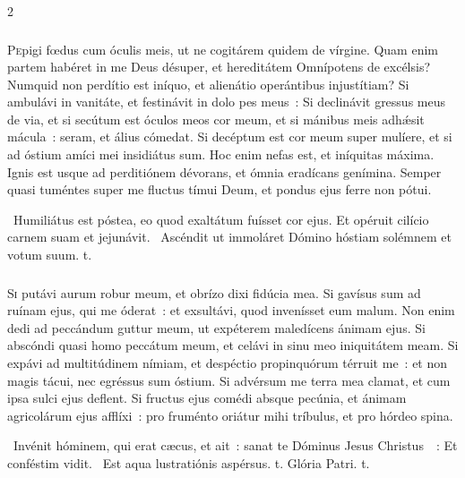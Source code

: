 \documentclass[9pt,twoside]{extarticle}
\begin{document}
\begin{multicols}{2}
{{\subsubsection*{\center{}}
\lettrine{P}epigi fœdus cum óculis meis, ut ne cogitárem quidem de vírgine. Quam enim partem habéret in me Deus désuper, et hereditátem Omnípotens de excélsis? Numquid non perdítio est iníquo, et alienátio operántibus injustítiam? Si ambulávi in vanitáte, et festinávit in dolo pes meus~: Si declinávit gressus meus de via, et si secútum est óculos meos cor meum, et si mánibus meis adhǽsit mácula~: seram, et álius cómedat. Si decéptum est cor meum super mulíere, et si ad óstium amíci mei insidiátus sum. Hoc enim nefas est, et iníquitas máxima. Ignis est usque ad perditiónem dévorans, et ómnia eradícans genímina. Semper quasi tuméntes super me fluctus tímui Deum, et pondus ejus ferre non pótui.

\begin{tightlist}{}
\item {}~Humiliátus est póstea, eo quod exaltátum fuísset cor ejus. \textred{*} Et opéruit cilício carnem suam et jejunávit. ~Ascéndit ut immoláret Dómino hóstiam solémnem et votum suum. t.
\end{tightlist}

\subsubsection*{\center {}}
\lettrine{S}i putávi aurum robur meum, et obrízo dixi fidúcia mea. Si gavísus sum ad ruínam ejus, qui me óderat~: et exsultávi, quod invenísset eum malum. Non enim dedi ad peccándum guttur meum, ut expéterem maledícens ánimam ejus. Si abscóndi quasi homo peccátum meum, et celávi in sinu meo iniquitátem meam. Si expávi ad multitúdinem nímiam, et despéctio propinquórum térruit me~: et non magis tácui, nec egréssus sum óstium. Si advérsum me terra mea clamat, et cum ipsa sulci ejus deflent. Si fructus ejus comédi absque pecúnia, et ánimam agricolárum ejus afflíxi~: pro fruménto oriátur mihi tríbulus, et pro hórdeo spina.

\begin{tightlist}{}
\item {}~Invénit hóminem, qui erat cæcus, et ait~: sanat te Dóminus Jesus Christus~~: \textred{*} Et conféstim vidit. ~Est aqua lustratiónis aspérsus. t. Glória Patri. t.
\end{tightlist}

}}
\end{multicols}
\end{document}
